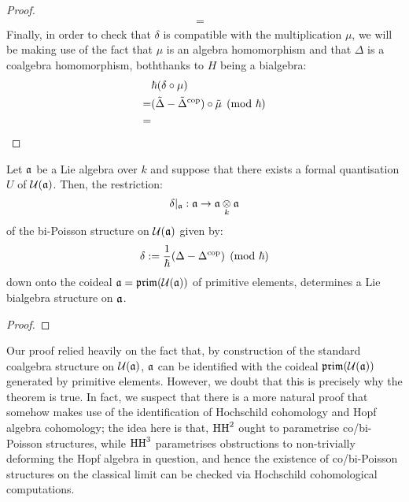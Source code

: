 \begin{proof}
$$\begin{aligned}
                            = & 
                        \end{aligned}
                    $$
                Finally, in order to check that $\delta$ is compatible with the multiplication $\mu$, we will be making use of the fact that $\mu$ is an algebra homomorphism and that $\Delta$ is a coalgebra homomorphism, boththanks to $H$ being a bialgebra:
                    $$
                        \begin{aligned}
                            & \hbar( \delta \circ \mu )
                            \\
                            = & (\tilde{\Delta} - \tilde{\Delta}^{\mathrm{cop}}) \circ \tilde{\mu} \pmod{\hbar}
                            \\
                            = & 
                        \end{aligned}
                    $$
            \end{proof}
        \begin{theorem} \label{theorem: lie_bialgebra_structures_from_bi_poisson_structures}
            Let $\mathfrak{a}$ be a Lie algebra over $k$ and suppose that there exists a formal quantisation $U$ of $\mathcal{U}(\mathfrak{a})$. Then, the restriction:
                $$\delta|_{\a}: \a \to \a \tensor_k \a$$
            of the bi-Poisson structure on $\mathcal{U}(\mathfrak{a})$ given by:
                $$\delta := \frac{1}{\hbar}(\Delta - \Delta^{\mathrm{cop}}) \pmod{\hbar}$$
            down onto the coideal $\mathfrak{a} = \mathfrak{prim}(\mathcal{U}(\mathfrak{a}))$ of primitive elements, determines a Lie bialgebra structure on $\mathfrak{a}$.    
        \end{theorem}
            \begin{proof}
                
            \end{proof}
        \begin{remark}
            Our proof relied heavily on the fact that, by construction of the standard coalgebra structure on $\mathcal{U}(\mathfrak{a})$, $\mathfrak{a}$ can be identified with the coideal $\mathfrak{prim}(\mathcal{U}(\mathfrak{a}))$ generated by primitive elements. However, we doubt that this is precisely why the theorem is true. In fact, we suspect that there is a more natural proof that somehow makes use of the identification of Hochschild cohomology and Hopf algebra cohomology; the idea here is that, $\mathrm{HH}^2$ ought to parametrise co/bi-Poisson structures, while $\mathrm{HH}^3$ parametrises obstructions to non-trivially deforming the Hopf algebra in question, and hence the existence of co/bi-Poisson structures on the classical limit can be checked via Hochschild cohomological computations. 
        \end{remark}
    
